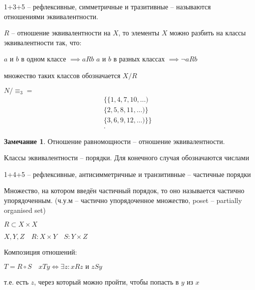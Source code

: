\documentclass{book}
\theoremstyle{definition}
\newtheorem*{note}{Замечание}
\begin{document}
        \begin{definition}
            1+3+5 -- рефлексивные, симметричные и тразитивные -- называются отношениями эквивалентности. 
        \end{definition}
        \begin{theorem}
            $R$ -- отношение эквивалентности на $X$, то элементы $X$ можно разбить на классы эквивалентности так, что:

            $a$ и $b$  в одном классе $\implies  aRb$
            $a$ и $b$  в разных  классах $\implies \neg aRb$

            множество таких классов обозначается $X / R$

            $N / \equiv_3 = $
            \begin{align*}
                \{\{1,4,7,10,\ldots)\\
                        \{2,5,8,11,\ldots)\}\\
                        \{3,6,9,12,\ldots)\}\}\\
            .\end{align*}   
        \end{theorem}
        \begin{note}
            Отношение равномощности -- отношение эквивалентности.

            Классы эквивалентности -- порядки. Для конечного случая обозначаются числами
        \end{note}

        \begin{definition}
            1+4+5 -- рефлексивные, антисимметричные и транзитивные -- частичные порядки

            Множество, на котором введён частичный порядок, то оно называется частично упорядоченным. (ч.у.м -- частично упорядоченное множество, poset -- partially organised set)
        \end{definition}
        
        $R\subset X\times X$

   $X, Y, Z\quad R:X\times Y\quad S:Y\times Z$

   \begin{definition}
       Композиция отношений: 

       $T = R\circ S\quad xTy \iff \exists z: xRz \text{ и } zSy$

       т.е. есть $z$, через который можно пройти, чтобы попасть в $y$ из $x$
   \end{definition}
\end{document}
